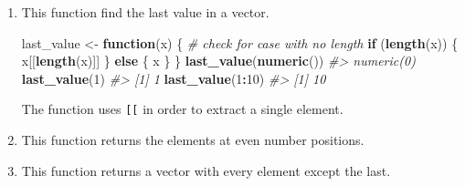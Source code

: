\documentclass[]{book}
\newenvironment{Shaded}{\begin{snugshade}}{\end{snugshade}}
\newcommand{\CommentTok}[1]{\textcolor[rgb]{0.56,0.35,0.01}{\textit{#1}}}
\newcommand{\ControlFlowTok}[1]{\textcolor[rgb]{0.13,0.29,0.53}{\textbf{#1}}}
\newcommand{\DecValTok}[1]{\textcolor[rgb]{0.00,0.00,0.81}{#1}}
\newcommand{\KeywordTok}[1]{\textcolor[rgb]{0.13,0.29,0.53}{\textbf{#1}}}
\newcommand{\NormalTok}[1]{#1}
\newcommand{\OperatorTok}[1]{\textcolor[rgb]{0.81,0.36,0.00}{\textbf{#1}}}
\newcommand{\StringTok}[1]{\textcolor[rgb]{0.31,0.60,0.02}{#1}}
\theoremstyle{plain}
\theoremstyle{remark}
\begin{document}
\begin{enumerate}
\def\labelenumi{\arabic{enumi}.}
\item
  This function find the last value in a vector.

\begin{Shaded}
\begin{Highlighting}[]
\NormalTok{last_value <-}\StringTok{ }\ControlFlowTok{function}\NormalTok{(x) \{}
  \CommentTok{# check for case with no length}
  \ControlFlowTok{if}\NormalTok{ (}\KeywordTok{length}\NormalTok{(x)) \{}
\NormalTok{    x[[}\KeywordTok{length}\NormalTok{(x)]]  }
\NormalTok{  \} }\ControlFlowTok{else}\NormalTok{ \{}
\NormalTok{    x}
\NormalTok{  \}}
\NormalTok{\}}
\KeywordTok{last_value}\NormalTok{(}\KeywordTok{numeric}\NormalTok{())}
\CommentTok{#> numeric(0)}
\KeywordTok{last_value}\NormalTok{(}\DecValTok{1}\NormalTok{)}
\CommentTok{#> [1] 1}
\KeywordTok{last_value}\NormalTok{(}\DecValTok{1}\OperatorTok{:}\DecValTok{10}\NormalTok{)}
\CommentTok{#> [1] 10}
\end{Highlighting}
\end{Shaded}

  The function uses \texttt{{[}{[}} in order to extract a single element.
\item
  This function returns the elements at even number positions.

\begin{Shaded}
\end{Shaded}
\item
  This function returns a vector with every element except the last.


\end{enumerate}
\end{document}
